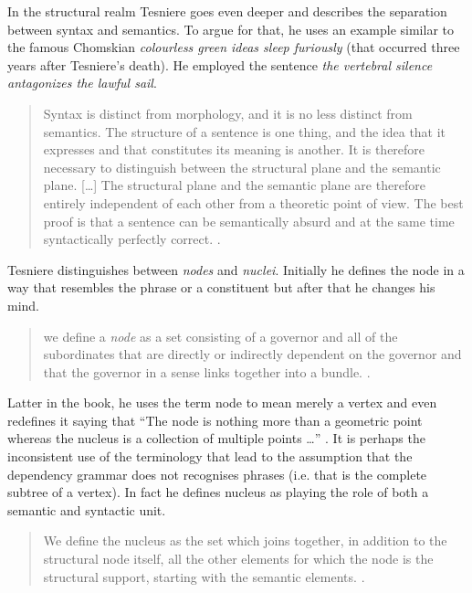 In the structural realm Tesniere goes even deeper and describes the separation between syntax and semantics. To argue for that, he uses an example similar to the famous Chomskian \textit{colourless green ideas sleep furiously} \citep{Chomsky57} (that occurred three years after Tesniere's death). He employed the sentence \textit{the vertebral silence antagonizes the lawful sail}.

\begin{quotation}
    Syntax is distinct from morphology, and it is no less distinct from semantics. The structure of a sentence is one thing, and the idea that it expresses and that constitutes its meaning is another. It is therefore necessary to distinguish between the structural plane and the semantic plane.
    [\dots]
    The structural plane and the semantic plane are therefore entirely independent of each other from a theoretic point of view. The best proof is that a sentence can be ­semantically absurd and at the same time syntactically perfectly correct. \citep[33]{Tesniere2015}.
\end{quotation}

Tesniere distinguishes between \textit{nodes} and \textit{nuclei}. Initially he defines the node in a way that resembles the phrase or a constituent but after that he changes his mind.  

\begin{quotation}
    we define a \textit{node} as a set consisting of a governor and all of the subordinates that are directly or indirectly dependent on the governor and that the governor in a sense links together into a bundle. \citep[6]{Tesniere2015}.
\end{quotation}

Latter in the book, he uses the term node to mean merely a vertex and even redefines it saying that ``The node is nothing more than a geometric point whereas the nucleus is a collection of multiple points \dots'' \cite[39]{Tesniere2015}. It is perhaps the inconsistent use of the terminology that lead to the assumption that the dependency grammar does not recognises phrases (i.e. that is the complete subtree of a vertex). In fact he defines nucleus as playing the role of both a semantic and syntactic unit.

\begin{quotation}
    We define the nucleus as the set which joins together, in addition to the structural node itself, all the other elements for which the node is the structural support, starting with the semantic elements. \citep[38]{Tesniere2015}.
\end{quotation}

